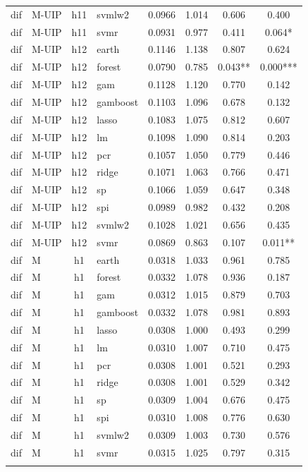 \begin{ThreePartTable}
\begin{longtable}[t]{llclcccc}
dif & M-UIP & h11 & svmlw2 & 0.0966 & 1.014 & 0.606 & 0.400\\
dif & M-UIP & h11 & svmr & 0.0931 & 0.977 & 0.411 & 0.064*\\
\addlinespace
dif & M-UIP & h12 & earth & 0.1146 & 1.138 & 0.807 & 0.624\\
dif & M-UIP & h12 & forest & 0.0790 & 0.785 & 0.043** & 0.000***\\
dif & M-UIP & h12 & gam & 0.1128 & 1.120 & 0.770 & 0.142\\
dif & M-UIP & h12 & gamboost & 0.1103 & 1.096 & 0.678 & 0.132\\
dif & M-UIP & h12 & lasso & 0.1083 & 1.075 & 0.812 & 0.607\\
dif & M-UIP & h12 & lm & 0.1098 & 1.090 & 0.814 & 0.203\\
dif & M-UIP & h12 & pcr & 0.1057 & 1.050 & 0.779 & 0.446\\
dif & M-UIP & h12 & ridge & 0.1071 & 1.063 & 0.766 & 0.471\\
dif & M-UIP & h12 & sp & 0.1066 & 1.059 & 0.647 & 0.348\\
dif & M-UIP & h12 & spi & 0.0989 & 0.982 & 0.432 & 0.208\\
dif & M-UIP & h12 & svmlw2 & 0.1028 & 1.021 & 0.656 & 0.435\\
dif & M-UIP & h12 & svmr & 0.0869 & 0.863 & 0.107 & 0.011**\\
\addlinespace
dif & M & h1 & earth & 0.0318 & 1.033 & 0.961 & 0.785\\
dif & M & h1 & forest & 0.0332 & 1.078 & 0.936 & 0.187\\
dif & M & h1 & gam & 0.0312 & 1.015 & 0.879 & 0.703\\
dif & M & h1 & gamboost & 0.0332 & 1.078 & 0.981 & 0.893\\
dif & M & h1 & lasso & 0.0308 & 1.000 & 0.493 & 0.299\\
dif & M & h1 & lm & 0.0310 & 1.007 & 0.710 & 0.475\\
dif & M & h1 & pcr & 0.0308 & 1.001 & 0.521 & 0.293\\
dif & M & h1 & ridge & 0.0308 & 1.001 & 0.529 & 0.342\\
dif & M & h1 & sp & 0.0309 & 1.004 & 0.676 & 0.475\\
dif & M & h1 & spi & 0.0310 & 1.008 & 0.776 & 0.630\\
dif & M & h1 & svmlw2 & 0.0309 & 1.003 & 0.730 & 0.576\\
dif & M & h1 & svmr & 0.0315 & 1.025 & 0.797 & 0.315\\
\addlinespace

\end{longtable}
\end{ThreePartTable}
